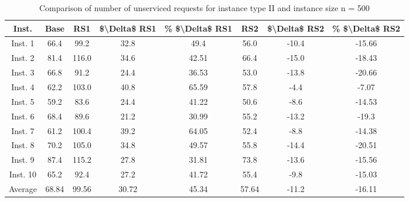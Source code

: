\begin{table}[H]
\centering
\begin{tabular}{cccccccc}
  \hline
  \textbf{Inst.} & \textbf{Base} & \textbf{RS1} & \textbf{\$\textbackslash{}Delta\$  RS1} & \textbf{\% \$\textbackslash{}Delta\$  RS1} & \textbf{RS2} & \textbf{\$\textbackslash{}Delta\$  RS2} & \textbf{\% \$\textbackslash{}Delta\$  RS2} \\\hline
  Inst. 1 & 66.4 & 99.2 & 32.8 & 49.4 & 56.0 & -10.4 & -15.66 \\
  Inst. 2 & 81.4 & 116.0 & 34.6 & 42.51 & 66.4 & -15.0 & -18.43 \\
  Inst. 3 & 66.8 & 91.2 & 24.4 & 36.53 & 53.0 & -13.8 & -20.66 \\
  Inst. 4 & 62.2 & 103.0 & 40.8 & 65.59 & 57.8 & -4.4 & -7.07 \\
  Inst. 5 & 59.2 & 83.6 & 24.4 & 41.22 & 50.6 & -8.6 & -14.53 \\
  Inst. 6 & 68.4 & 89.6 & 21.2 & 30.99 & 55.2 & -13.2 & -19.3 \\
  Inst. 7 & 61.2 & 100.4 & 39.2 & 64.05 & 52.4 & -8.8 & -14.38 \\
  Inst. 8 & 70.2 & 105.0 & 34.8 & 49.57 & 55.8 & -14.4 & -20.51 \\
  Inst. 9 & 87.4 & 115.2 & 27.8 & 31.81 & 73.8 & -13.6 & -15.56 \\
  Inst. 10 & 65.2 & 92.4 & 27.2 & 41.72 & 55.4 & -9.8 & -15.03 \\
  Average & 68.84 & 99.56 & 30.72 & 45.34 & 57.64 & -11.2 & -16.11 \\\hline
\end{tabular}
\caption{Comparison of number of unserviced requests for instance type II and instance size n = 500}
\label{tab:wait:resrelocation-nTaxi-comparison_II_500}
\end{table}

